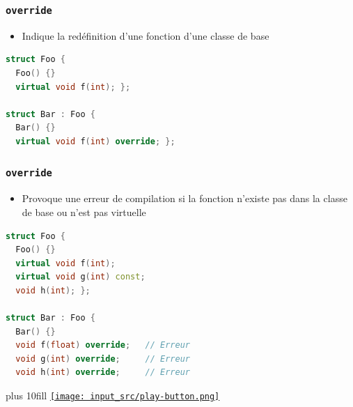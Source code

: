 \documentclass[C++.tex]{subfiles}
\begin{document}
\begin{frame}[fragile]
	\frametitle{\lstinline|override|}
	\begin{itemize}
		\item Indique la redéfinition d'une fonction d'une classe de base
	\end{itemize}

	\begin{lstlisting}[language=C++]
struct Foo {
  Foo() {}
  virtual void f(int); };

struct Bar : Foo {
  Bar() {}
  virtual void f(int) override; };
\end{lstlisting}
\end{frame}

\begin{frame}[fragile]
	\frametitle{\lstinline|override|}
	\begin{itemize}
		\item Provoque une erreur de compilation si la fonction n'existe pas dans la classe de base ou n'est pas virtuelle
	\end{itemize}

	\begin{lstlisting}[language=C++]
struct Foo {
  Foo() {}
  virtual void f(int); 
  virtual void g(int) const;
  void h(int); };

struct Bar : Foo {
  Bar() {}
  void f(float) override;   // Erreur 
  void g(int) override;     // Erreur
  void h(int) override;     // Erreur\end{lstlisting}

	\vskip 10mm plus 10fill
	\hfill
	\href{https://godbolt.org/#g:!((g:!((g:!((h:codeEditor,i:(filename:'1',fontScale:14,fontUsePx:'0',j:1,lang:c%2B%2B,selection:(endColumn:28,endLineNumber:14,positionColumn:28,positionLineNumber:14,selectionStartColumn:23,selectionStartLineNumber:14,startColumn:23,startLineNumber:14),source:'%23include+%3Ciostream%3E%0A%23include+%3Cstring%3E%0A%0Astruct+Foo%0A%7B%0A++Foo()%0A++%7B%0A++%7D%0A%0A++virtual+void+f(int)%0A++%7B%0A++%7D%0A%0A++virtual+void+g(int)+const%0A++%7B%0A++%7D%0A%0A++void+h(int)%0A++%7B%0A++%7D%0A%7D%3B%0A%0Astruct+Bar+:+Foo%0A%7B%0A++Bar()%0A++%7B%0A++%7D%0A%0A++void+f(float)+override%0A++%7B%0A++%7D%0A%0A++void+g(int)+override%0A++%7B%0A++%7D%0A%0A++void+h(int)+override%0A++%7B%0A++%7D%0A%0A++void+i(int)+override%0A++%7B%0A++%7D%0A%7D%3B%0A%0Aint+main()%0A%7B%0A%7D%0A'),l:'5',n:'0',o:'C%2B%2B+source+%231',t:'0')),k:50,l:'4',n:'0',o:'',s:0,t:'0'),(g:!((h:executor,i:(argsPanelShown:'1',compilationPanelShown:'0',compiler:g112,compilerOutShown:'0',execArgs:'',execStdin:'',fontScale:14,fontUsePx:'0',j:1,lang:c%2B%2B,libs:!((name:boost,ver:'175')),options:'-std%3Dc%2B%2B11',source:1,stdinPanelShown:'1',tree:'1',wrap:'0'),l:'5',n:'0',o:'Executor+x86-64+gcc+11.2+(C%2B%2B,+Editor+%231)',t:'0')),header:(),k:50,l:'4',n:'0',o:'',s:0,t:'0')),l:'2',n:'0',o:'',t:'0')),version:4}{\texttt{[image: input\_src/play-button.png]}}
\end{frame}
\end{document}
